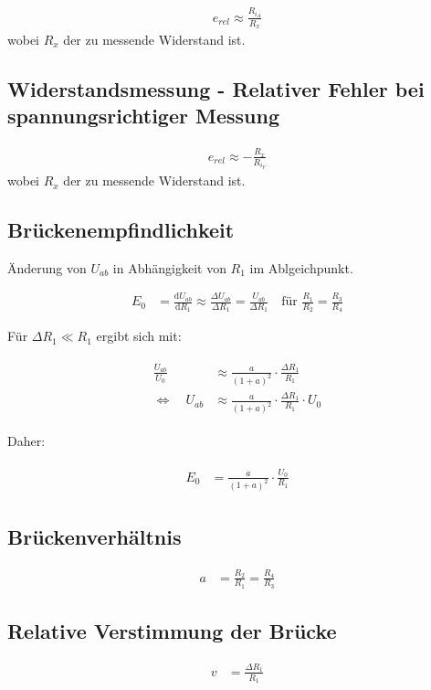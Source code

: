 \begin{align}
    e_{rel} \approx \frac{R_{i_A}}{R_x}
\end{align}
wobei \(R_x\) der zu messende Widerstand ist.

\subsection*{Widerstandsmessung - Relativer Fehler bei spannungsrichtiger Messung}

\begin{align}
    e_{rel} \approx -\frac{R_x}{R_{i_V}}
\end{align}
wobei \(R_x\) der zu messende Widerstand ist.

\newpage

\subsection*{Brückenempfindlichkeit}

Änderung von \( U_{ab} \) in Abhängigkeit von \( R_1 \) im Ablgeichpunkt.

\begin{align}
    E_0 &= \frac{ \text{d} U_{ab} }{ \text{d} R_1 }
    \approx \frac{ \Delta U_{ab} }{ \Delta R_1 }
    = \frac{ U_{ab} }{ \Delta R_1 }
    \quad \text{für } \frac{R_1}{R_2} = \frac{R_3}{R_4}
\end{align}

Für \( \Delta R_1 \ll R_1 \) ergibt sich mit:

\begin{align}
    \begin{split}
        \frac{ U_{ab} }{ U_0 } &\approx \frac{ a }{ \left( 1 + a \right)^2 } \cdot \frac{ \Delta R_1 }{ R_1 } \\
        \iff \quad U_{ab} &\approx \frac{ a }{ \left( 1 + a \right)^2 } \cdot \frac{ \Delta R_1 }{ R_1 } \cdot U_0
    \end{split}
\end{align}

Daher:

\begin{align}
    \begin{split}
        E_0 &= \frac{ a }{ \left( 1 + a \right)^2 } \cdot \frac{ U_0 }{ R_1 }
    \end{split}
\end{align}

\subsection*{Brückenverhältnis}

\begin{align}
    a &= \frac{ R_2 }{ R_1 } = \frac{ R_4 }{ R_3 }
\end{align}

\subsection*{Relative Verstimmung der Brücke}

\begin{align}
    v &= \frac{ \Delta R_1 }{ R_1 }
\end{align}
